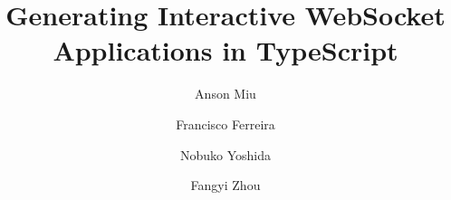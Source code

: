 \documentclass[submission,copyright,creativecommons]{eptcs}
\title{Generating Interactive WebSocket Applications in TypeScript}
\author{Anson Miu
\institute{Imperial College London}
\and
Francisco Ferreira
\institute{Imperial College London}
\and
Nobuko Yoshida
\institute{Imperial College London}
\and
Fangyi Zhou
\institute{Imperial College London}
}
\begin{document}
\maketitle








\nocite{*}


\end{document}
